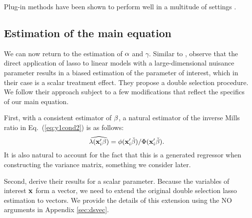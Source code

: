 \documentclass[11pt]{article}
\begin{document}
Plug-in methods have been shown to perform well in a multitude of settings %
\cite[see, e.g.,][]{drukker/liu:22, belloni/cherno/hans/kozbur:16, bellonichernozhukovhansen2014}. 

	\subsection{Estimation of the main equation}


We can now return to the estimation of $\mathbf{\alpha}$ and $\gamma$. Similar to \cite{bellonichernozhukovwei2016}, \cite{bellonichernozhukovhansen2014} %
observe that the direct application of lasso to linear models with a large-dimensional nuisance parameter results in a biased estimation of the parameter of interest, which in their case is a scalar treatment effect. They propose a double selection procedure. We follow their approach subject to a few modifications that reflect the specifics of our main equation. 

First, with a consistent estimator of $\mathbf{\beta}$, a natural estimator of the inverse Mills ratio in Eq.~(\ref{eq:y1cond2}) is as follows: \[\widehat{\lambda(\mathbf{x}_i'\mathbf{\beta})}
	= \phi(\mathbf{x}_i'\check{\mathbf{\beta}})/\Phi(\mathbf{x}_i'\check{\mathbf{\beta}}).\] 
It is also natural to account for the fact that this is a generated regressor when constructing the variance matrix, something we consider later.

Second, \cite{bellonichernozhukovhansen2014} derive their results for a scalar parameter. Because the variables of interest $\mathbf{x}$ %
form a vector, we need to extend the
original double selection lasso estimation to vectors. We provide the details of this extension using the NO arguments in Appendix
\ref{sec:dsvec}. 
\end{document}
